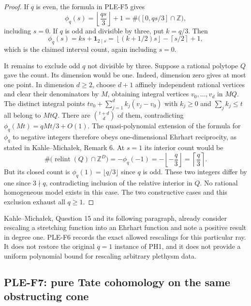 \documentclass[11pt,a4paper]{article}
\begin{document}
\begin{proof}
If $q$ is even, the formula in PLE-F5 gives
\[
 \phi_q(s)=\left\lfloor\frac{qs}{3}\right\rfloor+1
 =\#\bigl([0,qs/3]\cap\mathbb Z\bigr),
\]
including $s=0$. If $q$ is odd and divisible by three, put $k=q/3$.
Then
\[
 \phi_q(s)=ks+\mathbf1_{2\mid s}
 =\left\lfloor(k+1/2)s\right\rfloor
  -\left\lceil s/2\right\rceil+1,
\]
which is the claimed interval count, again including $s=0$.

It remains to exclude odd $q$ not divisible by three. Suppose a rational
polytope $Q$ gave the count. Its dimension would be one. Indeed,
dimension zero gives at most one point. In dimension $d\ge2$, choose
$d+1$ affinely independent rational vertices and clear their denominators
by $M$, obtaining integral vertices $v_0,\ldots,v_d$ in $MQ$. The distinct
integral points
$tv_0+\sum_{j=1}^d k_j(v_j-v_0)$ with $k_j\ge0$ and
$\sum_jk_j\le t$ all belong to $MtQ$. There are
$\binom{t+d}{d}$ of them, contradicting
$\phi_q(Mt)=qMt/3+O(1)$.
The quasi-polynomial extension of the formula for $\phi_q$ to negative
integers therefore obeys one-dimensional Ehrhart reciprocity, as stated
in Kahle--Micha\l ek, Remark 6. At $s=1$ its interior count would be
\[
 \#\bigl(\operatorname{relint}(Q)\cap\mathbb Z^D\bigr)
 =-\phi_q(-1)
 =-\left\lfloor-\frac q3\right\rfloor
 =\left\lceil\frac q3\right\rceil.
\]
But its closed count is
$\phi_q(1)=\lfloor q/3\rfloor$ since $q$ is odd. These two integers
differ by one since $3\nmid q$, contradicting inclusion of the relative
interior in $Q$. No rational homogeneous model exists in this case.
The two constructive cases and this exclusion exhaust all $q\ge1$.
\end{proof}

Kahle--Micha\l ek, Question 15 and its following paragraph, already
consider rescaling a stretching function into an Ehrhart function and
note a positive result in degree one. PLE-F6 records the exact allowed
rescalings for this particular ray. It does not restore the original
$q=1$ instance of PH1, and it does not provide a uniform polynomial bound
for rescaling arbitrary plethysm data.

\subsection{PLE-F7: pure Tate cohomology on the same obstructing cone}
\end{document}
